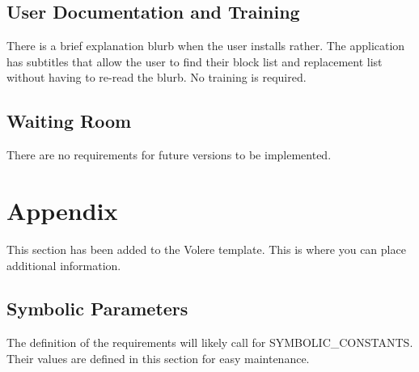 \documentclass[12pt, titlepage]{article}
\begin{document}
\subsection{User Documentation and Training}
There is a brief explanation blurb when the user installs rather. The application has subtitles that allow the user to find their block list and replacement list without having to re-read the blurb. No training is required.

\subsection{Waiting Room}
There are no requirements for future versions to be implemented.

\section{Appendix}

This section has been added to the Volere template.  This is where you can place
additional information.

\subsection{Symbolic Parameters}

The definition of the requirements will likely call for SYMBOLIC\_CONSTANTS.
Their values are defined in this section for easy maintenance.
\end{document}
